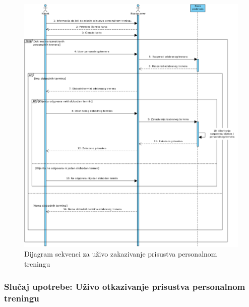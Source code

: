 \newpage
\begin{figure}[!ht]
\begin{center}
\includegraphics[scale=0.40]{sections/images/dijagram_sekvenci_personalni_uzivo_zakazivanje_prisustva.png}
\end{center}
\caption{Dijagram sekvenci za uživo zakazivanje prisustva personalnom treningu}
\label{fig:kontekst}
\end{figure}

    
   



\subsubsection{Slučaj upotrebe: Uživo otkazivanje prisustva personalnom treningu}

